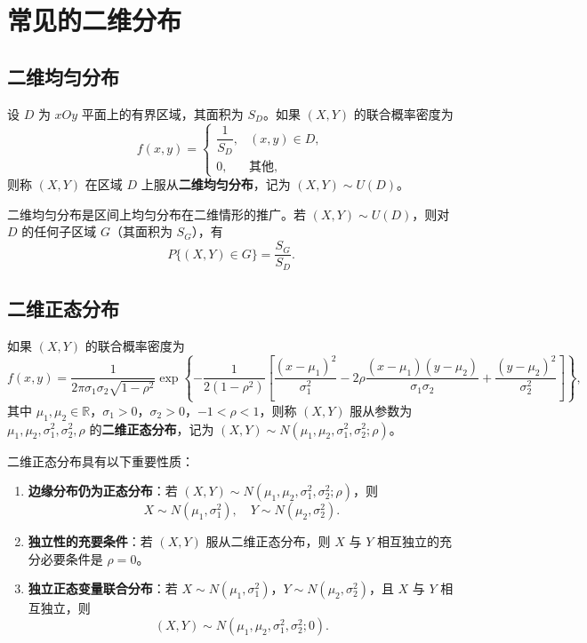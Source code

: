 \documentclass[lang=cn,11pt]{elegantbook}
\begin{document}
\section{常见的二维分布}

\subsection{二维均匀分布}

\begin{definition}[二维均匀分布] \label{def:2d-uniform}
设 $D$ 为 $xOy$ 平面上的有界区域，其面积为 $S_D$。如果 $(X,Y)$ 的联合概率密度为
\[
f(x,y) = \begin{cases} \dfrac{1}{S_D}, & (x,y) \in D, \\ 0, & \text{其他}, \end{cases}
\]
则称 $(X,Y)$ 在区域 $D$ 上服从\textbf{二维均匀分布}，记为 $(X,Y) \sim U(D)$。
\end{definition}

二维均匀分布是区间上均匀分布在二维情形的推广。若 $(X,Y) \sim U(D)$，则对 $D$ 的任何子区域 $G$（其面积为 $S_G$），有
\[
P\{(X,Y) \in G\} = \frac{S_G}{S_D}.
\]

\subsection{二维正态分布}

\begin{definition}[二维正态分布] \label{def:2d-normal}
如果 $(X,Y)$ 的联合概率密度为
\[
f(x,y) = \frac{1}{2\pi\sigma_1\sigma_2\sqrt{1-\rho^2}}\exp\left\{-\frac{1}{2(1-\rho^2)}\left[\frac{(x-\mu_1)^2}{\sigma_1^2} - 2\rho\frac{(x-\mu_1)(y-\mu_2)}{\sigma_1\sigma_2} + \frac{(y-\mu_2)^2}{\sigma_2^2}\right]\right\},
\]
其中 $\mu_1, \mu_2 \in \mathbb{R}$，$\sigma_1 > 0$，$\sigma_2 > 0$，$-1 < \rho < 1$，则称 $(X,Y)$ 服从参数为 $\mu_1, \mu_2, \sigma_1^2, \sigma_2^2, \rho$ 的\textbf{二维正态分布}，记为 $(X,Y) \sim N(\mu_1, \mu_2, \sigma_1^2, \sigma_2^2; \rho)$。
\end{definition}

\begin{property}\label{prop:2d-normal}
二维正态分布具有以下重要性质：
\begin{enumerate}
    \item \textbf{边缘分布仍为正态分布}：若 $(X,Y) \sim N(\mu_1, \mu_2, \sigma_1^2, \sigma_2^2; \rho)$，则
    \[
    X \sim N(\mu_1, \sigma_1^2), \quad Y \sim N(\mu_2, \sigma_2^2).
    \]
    \item \textbf{独立性的充要条件}：若 $(X,Y)$ 服从二维正态分布，则 $X$ 与 $Y$ 相互独立的充分必要条件是 $\rho = 0$。
    \item \textbf{独立正态变量联合分布}：若 $X \sim N(\mu_1, \sigma_1^2)$，$Y \sim N(\mu_2, \sigma_2^2)$，且 $X$ 与 $Y$ 相互独立，则
    \[
    (X,Y) \sim N(\mu_1, \mu_2, \sigma_1^2, \sigma_2^2; 0).
    \]
\end{enumerate}
\end{property}
\end{document}
